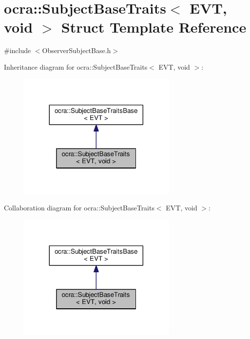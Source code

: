 \hypertarget{structocra_1_1SubjectBaseTraits_3_01EVT_00_01void_01_4}{}\section{ocra\+:\+:Subject\+Base\+Traits$<$ E\+VT, void $>$ Struct Template Reference}
\label{structocra_1_1SubjectBaseTraits_3_01EVT_00_01void_01_4}


{\ttfamily \#include $<$Observer\+Subject\+Base.\+h$>$}



Inheritance diagram for ocra\+:\+:Subject\+Base\+Traits$<$ E\+VT, void $>$\+:
\nopagebreak
\begin{figure}[H]
\begin{center}
\leavevmode
\includegraphics[width=224pt]{dc/d1e/structocra_1_1SubjectBaseTraits_3_01EVT_00_01void_01_4__inherit__graph}
\end{center}
\end{figure}


Collaboration diagram for ocra\+:\+:Subject\+Base\+Traits$<$ E\+VT, void $>$\+:
\nopagebreak
\begin{figure}[H]
\begin{center}
\leavevmode
\includegraphics[width=224pt]{d7/df7/structocra_1_1SubjectBaseTraits_3_01EVT_00_01void_01_4__coll__graph}
\end{center}
\end{figure}

